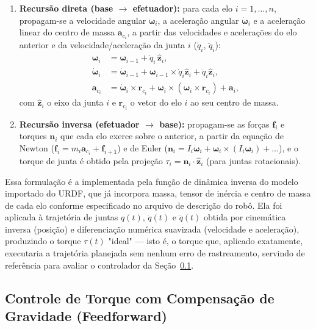 \begin{enumerate}
\item \textbf{Recursão direta (base $\rightarrow$ efetuador):} para cada
elo $i = 1,\dots,n$, propagam-se a velocidade angular $\boldsymbol{\omega}_i$,
a aceleração angular $\dot{\boldsymbol{\omega}}_i$ e a aceleração linear do
centro de massa $\mathbf{a}_{c_i}$, a partir das velocidades e acelerações
do elo anterior e da velocidade/aceleração da junta $i$ ($\dot q_i$,
$\ddot q_i$):
\begin{align}
\boldsymbol{\omega}_i &= \boldsymbol{\omega}_{i-1} + \dot q_i\, \hat{\mathbf z}_i, \\
\dot{\boldsymbol{\omega}}_i &= \dot{\boldsymbol{\omega}}_{i-1}
+ \boldsymbol{\omega}_{i-1}\times \dot q_i \hat{\mathbf z}_i + \ddot q_i \hat{\mathbf z}_i, \\
\mathbf{a}_{c_i} &= \dot{\boldsymbol{\omega}}_i \times \mathbf{r}_{c_i}
+ \boldsymbol{\omega}_i \times (\boldsymbol{\omega}_i \times \mathbf{r}_{c_i}) + \mathbf{a}_i,
\end{align}
com $\hat{\mathbf z}_i$ o eixo da junta $i$ e $\mathbf{r}_{c_i}$ o vetor do
elo $i$ ao seu centro de massa.

\item \textbf{Recursão inversa (efetuador $\rightarrow$ base):} propagam-se
as forças $\mathbf{f}_i$ e torques $\mathbf{n}_i$ que cada elo exerce sobre
o anterior, a partir da equação de Newton ($\mathbf{f}_i = m_i \mathbf{a}_{c_i}
+ \mathbf{f}_{i+1}$) e de Euler ($\mathbf{n}_i = I_i \dot{\boldsymbol{\omega}}_i
+ \boldsymbol{\omega}_i \times (I_i \boldsymbol{\omega}_i) + \dots$), e o
torque de junta é obtido pela projeção
$\tau_i = \mathbf{n}_i \cdot \hat{\mathbf z}_i$ (para juntas rotacionais).
\end{enumerate}

Essa formulação é a implementada pela função de dinâmica inversa do modelo
importado do URDF, que já incorpora massa, tensor de inércia e centro de
massa de cada elo conforme especificado no arquivo de descrição do robô.
Ela foi aplicada à trajetória de juntas $q(t)$, $\dot{q}(t)$ e $\ddot{q}(t)$
obtida por cinemática inversa (posição) e diferenciação numérica suavizada
(velocidade e aceleração), produzindo o torque $\tau(t)$ "ideal" — isto é,
o torque que, aplicado exatamente, executaria a trajetória planejada sem
nenhum erro de rastreamento, servindo de referência para avaliar o
controlador da Seção~\ref{sec:controle}.

\subsection{Controle de Torque com Compensação de Gravidade (Feedforward)}
\label{sec:controle}

